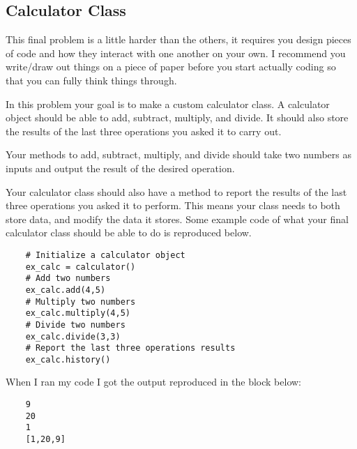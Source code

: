 \documentclass[12pt]{article}
\begin{document}
\newpage

\subsection{Calculator Class}

This final problem is a little harder than the others, it requires you design pieces of code and how they interact with one another on your own. I recommend you write/draw out things on a piece of paper before you start actually coding so that you can fully think things through.

In this problem your goal is to make a custom calculator class. A calculator object should be able to add, subtract, multiply, and divide. It should also store the results of the last three operations you asked it to carry out.

Your methods to add, subtract, multiply, and divide should take two numbers as inputs and output the result of the desired operation.

Your calculator class should also have a method to report the results of the last three operations you asked it to perform. This means your class needs to both store data, and modify the data it stores. Some example code of what your final calculator class should be able to do is reproduced below.

\begin{lstlisting}
    # Initialize a calculator object
    ex_calc = calculator()
    # Add two numbers
    ex_calc.add(4,5)
    # Multiply two numbers
    ex_calc.multiply(4,5)
    # Divide two numbers
    ex_calc.divide(3,3)
    # Report the last three operations results
    ex_calc.history()
\end{lstlisting}

When I ran my code I got the output reproduced in the block below:

\begin{lstlisting}
    9
    20
    1
    [1,20,9]
\end{lstlisting}
\end{document}
